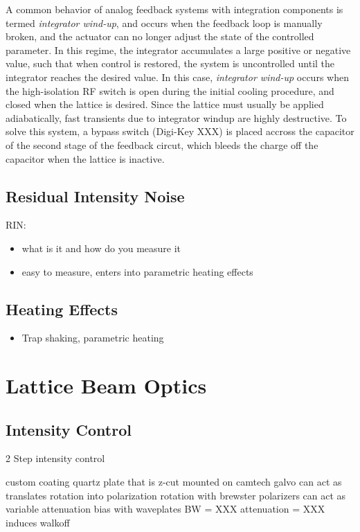 \documentclass[twocolumn,aps,pra,showpacs,preprintnumbers,bibnotes]{revtex4-1}
\begin{document}
A common behavior of analog feedback systems with integration components is termed \textit{integrator wind-up}, and occurs when the feedback loop is manually broken, and the actuator can no longer adjust the state of the controlled parameter. 
In this regime, the integrator accumulates a large positive or negative value, such that when control is restored, the system is uncontrolled until the integrator reaches the desired value.
In this case, \textit{integrator wind-up} occurs when the high-isolation RF switch is open during the initial cooling procedure, and closed when the lattice is desired. 
Since the lattice must usually be applied adiabatically, fast transients due to integrator windup are highly destructive.
To solve this system, a bypass switch (Digi-Key XXX) is placed accross the capacitor of the second stage of the feedback circut, which bleeds the charge off the capacitor when the lattice is inactive.


\subsection{Residual Intensity Noise}
RIN:
\begin{itemize}
\item what is it and how do you measure it
\item easy to measure, enters into parametric heating effects\cite{Savard1997}
\end{itemize}

\subsection{Heating Effects}
\begin{itemize}
	\item Trap shaking, parametric heating
\end{itemize}

\section{Lattice Beam Optics}


\subsection{Intensity Control}

2 Step intensity control

custom coating quartz plate that is z-cut mounted on camtech galvo
can act as translates rotation into polarization rotation
with brewster polarizers can act as variable attenuation
bias with waveplates
BW = XXX
attenuation = XXX
induces walkoff
\end{document}
